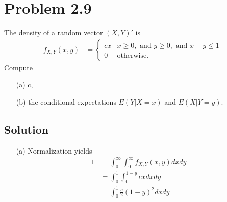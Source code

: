 \documentclass[10pt,a4paper]{article}
\theoremstyle{theorem}
\theoremstyle{definition}
\begin{document}
\section*{Problem 2.9}
The density of a random vector $(X, Y)'$ is 
\begin{align*}
f_{X, Y}(x, y) &= \begin{cases} 
      cx & x \geq 0, \text{ and } y \geq 0, \text{ and } x + y \leq 1 \\
      0 & \text{otherwise.}
   \end{cases}
\end{align*}
Compute 
\begin{enumerate}
\item[(a)] c,
\item[(b)] the conditional expectations $E(Y | X = x)$ and $E(X| Y = y)$.
\end{enumerate}

\subsection*{Solution}
\begin{enumerate}
\item[(a)] Normalization yields
\begin{align*}
1 &= \int_0^\infty \int_0^\infty f_{X, Y}(x, y) dx dy\\
&= \int_0^1 \int_0^{1 - y}  cx dx dy\\
&= \int_0^1 \frac{c}{2}(1 - y)^2 dx dy\\
\end{align*}
\end{enumerate}
\end{document}
